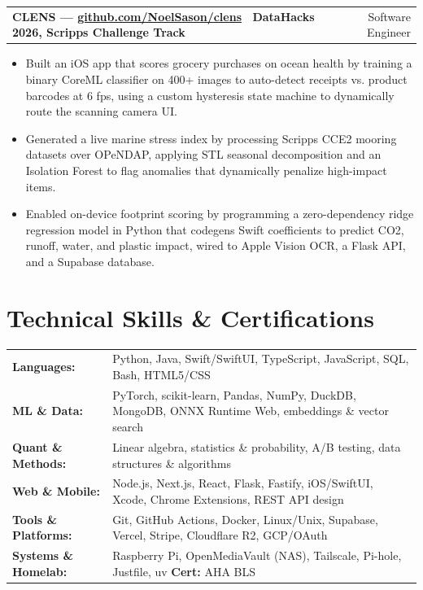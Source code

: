 \documentclass[letterpaper,11pt]{article}
\makeatletter
\newcommand{\resumeSubheadingSimple}[2]{
  \begin{tabular*}{\textwidth}[t]{@{}l@{\extracolsep{\fill}}r@{}}
    \textbf{#1} & \small #2
  \end{tabular*}\vspace{1pt}
}
\newcommand{\resumeItem}[1]{\item\small{#1}}
\newcommand{\resumeItemListStart}{\begin{itemize}[leftmargin=16pt, label=\textbullet, topsep=0pt, parsep=0pt, itemsep=2pt]}
\newcommand{\resumeItemListEnd}{\end{itemize}\vspace{1pt}}
\makeatother
\begin{document}
\resumeSubheadingSimple
  {CLENS --- \small\href{https://github.com/NoelSason/clens}{github.com/NoelSason/clens} \textbar\ DataHacks 2026, Scripps Challenge Track}{Software Engineer}
\resumeItemListStart
  \resumeItem{Built an iOS app that scores grocery purchases on ocean health by training a binary CoreML classifier on 400+ images to auto-detect receipts vs. product barcodes at 6 fps, using a custom hysteresis state machine to dynamically route the scanning camera UI.}
  \resumeItem{Generated a live marine stress index by processing Scripps CCE2 mooring datasets over OPeNDAP, applying STL seasonal decomposition and an Isolation Forest to flag anomalies that dynamically penalize high-impact items.}
  \resumeItem{Enabled on-device footprint scoring by programming a zero-dependency ridge regression model in Python that codegens Swift coefficients to predict CO2, runoff, water, and plastic impact, wired to Apple Vision OCR, a Flask API, and a Supabase database.}
\resumeItemListEnd

\section{Technical Skills \& Certifications}

\vspace{-2pt}
\small
\begin{tabular}{@{}l@{\hskip 12pt}p{5.75in}@{}}
  \textbf{Languages:} & Python, Java, Swift/SwiftUI, TypeScript, JavaScript, SQL, Bash, HTML5/CSS \\
  \textbf{ML \& Data:} & PyTorch, scikit-learn, Pandas, NumPy, DuckDB, MongoDB, ONNX Runtime Web, embeddings \& vector search \\
  \textbf{Quant \& Methods:} & Linear algebra, statistics \& probability, A/B testing, data structures \& algorithms \\
  \textbf{Web \& Mobile:} & Node.js, Next.js, React, Flask, Fastify, iOS/SwiftUI, Xcode, Chrome Extensions, REST API design \\
  \textbf{Tools \& Platforms:} & Git, GitHub Actions, Docker, Linux/Unix, Supabase, Vercel, Stripe, Cloudflare R2, GCP/OAuth \\
  \textbf{Systems \& Homelab:} & Raspberry Pi, OpenMediaVault (NAS), Tailscale, Pi-hole, Justfile, uv \quad \textbf{Cert:} AHA BLS \\
\end{tabular}
\end{document}
